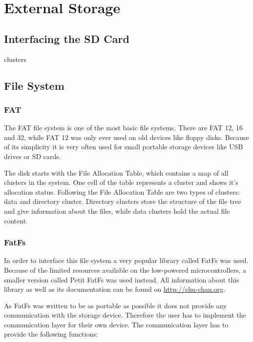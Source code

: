 \setchapterpreamble[u]{\margintoc}

\chapter{External Storage}

\section{Interfacing the SD Card}
\label{sec:interfacing-the-sd-card}

clusters

\section{File System}

\subsection{FAT}

The FAT file system is one of the most basic file systems. There are FAT 12, 16 and 32, while FAT 12 was only ever used on old devices like floppy disks. Because of its simplicity it is very often used for small portable storage devices like USB drives or SD cards. 

The disk starts with the File Allocation Table, which contains a map of all clusters in the system. One cell of the table represents a cluster and shows it's allocation status. Following the File Allocation Table are two types of clusters: data and directory cluster. Directory clusters store the structure of the file tree and give information about the files, while data clusters hold the actual file content.

\subsection{FatFs}

In order to interface this file system a very popular library called FatFs was used. Because of the limited resources available on the low-powered microcontrollers, a smaller version called Petit FatFs was used instead. All information about this library as well as its documentation can be found on \href{http://elm-chan.org/}{http://elm-chan.org}.

As FatFs was written to be as portable as possible it does not provide any communication with the storage device. Therefore the user has to implement the communication layer for their own device. The communication layer has to provide the following functions:

